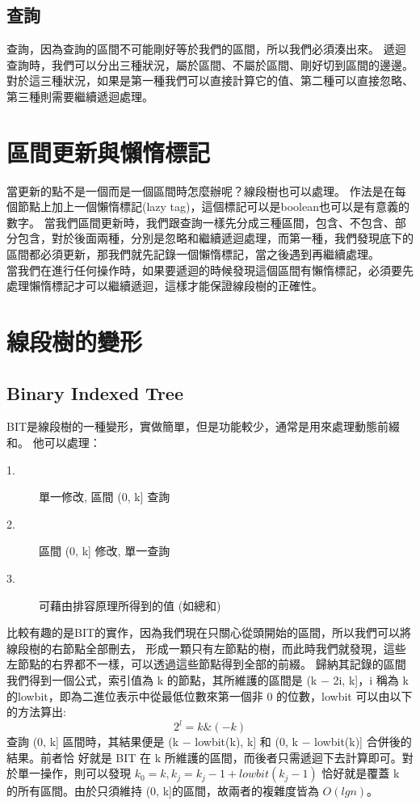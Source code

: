 \documentclass{article}
\begin{document}
\subsection{查詢}
查詢，因為查詢的區間不可能剛好等於我們的區間，所以我們必須湊出來。
遞迴查詢時，我們可以分出三種狀況，屬於區間、不屬於區間、剛好切到區間的邊邊。
對於這三種狀況，如果是第一種我們可以直接計算它的值、第二種可以直接忽略、第三種則需要繼續遞迴處理。


\section{區間更新與懶惰標記}
當更新的點不是一個而是一個區間時怎麼辦呢？線段樹也可以處理。
作法是在每個節點上加上一個懶惰標記(lazy tag)，這個標記可以是boolean也可以是有意義的數字。
當我們區間更新時，我們跟查詢一樣先分成三種區間，包含、不包含、部分包含，對於後面兩種，分別是忽略和繼續遞迴處理，而第一種，我們發現底下的區間都必須更新，那我們就先記錄一個懶惰標記，當之後遇到再繼續處理。\\
當我們在進行任何操作時，如果要遞迴的時候發現這個區間有懶惰標記，必須要先處理懶惰標記才可以繼續遞迴，這樣才能保證線段樹的正確性。


\section{線段樹的變形}
\subsection{Binary Indexed Tree}
BIT是線段樹的一種變形，實做簡單，但是功能較少，通常是用來處理動態前綴和。
他可以處理：
\begin{description}
\item[ 1.]單一修改, 區間 (0, k] 查詢
\item[ 2.]區間 (0, k] 修改, 單一查詢
\item[ 3.]可藉由排容原理所得到的值 (如總和)
\end{description}
比較有趣的是BIT的實作，因為我們現在只關心從頭開始的區間，所以我們可以將線段樹的右節點全部刪去，
形成一顆只有左節點的樹，而此時我們就發現，這些左節點的右界都不一樣，可以透過這些節點得到全部的前綴。
歸納其記錄的區間我們得到一個公式，索引值為 k 的節點，其所維護的區間是 (k − 2i, k]，i 稱為 k 的lowbit，即為二進位表示中從最低位數來第一個非 0 的位數，lowbit 可以由以下的方法算出:
$$2^l = k\&(−k)$$
查詢 (0, k] 區間時，其結果便是 (k − lowbit(k), k] 和 (0, k − lowbit(k)] 合併後的結果。前者恰
好就是 BIT 在 k 所維護的區間，而後者只需遞迴下去計算即可。對於單一操作，則可以發現 $k_0 = k, k_j = k_j−1 + lowbit(k_j−1)$ 恰好就是覆蓋 k 的所有區間。由於只須維持 (0, k]的區間，故兩者的複雜度皆為 $O(lg n)$。
\end{document}
